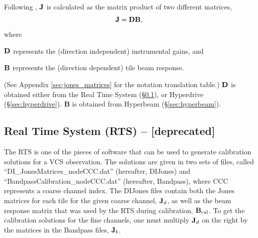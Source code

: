 \documentclass{book}
\begin{document}
Following \citep{Sokolowski2017}, ${\bf J}$ is calculated as the matrix product of two different matrices,
\begin{equation}
    {\bf J} = {\bf D}{\bf B},
\end{equation}
where

    ${\bf D}$ represents the (direction independent) instrumental gains, and

    ${\bf B}$ represents the (direction dependent) tile beam response.

\noindent (See Appendix \ref{sec:jones_matrices} for the notation translation table.) ${\bf D}$ is obtained either from the Real Time System (\S\ref{sec:RTS}), or Hyperdrive (\S\ref{sec:hyperdrive}). {\bf B} is obtained from Hyperbeam (\S\ref{sec:hyperbeam}).

\subsection{Real Time System (RTS) -- [deprecated]}
\label{sec:RTS}

The RTS is one of the pieces of software that can be used to generate calibration solutions for a VCS observation.
The solutions are given in two sets of files, called ``DI\_JonesMatrices\_nodeCCC.dat'' (hereafter, DIJones) and ``BandpassCalibration\_nodeCCC.dat'' (hereafter, Bandpass), where CCC represents a coarse channel index.
The DIJones files contain both the Jones matrices for each tile for the given coarse channel, ${\bf J}_d$, as well as the beam response matrix that was used by the RTS during calibration, ${\bf B}_\text{cal}$.
To get the calibration solutions for the fine channels, one must multiply ${\bf J}_d$ on the right by the matrices in the Bandpass files, ${\bf J}_b$.
\end{document}
